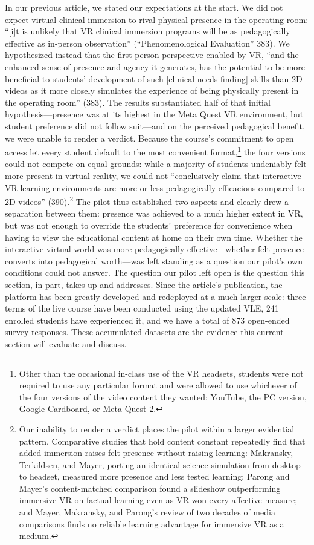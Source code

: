 In our previous article, we stated our expectations at the start. We did not
expect virtual clinical immersion to rival physical presence in the operating
room: ``[i]t is unlikely that VR clinical immersion programs will be as
pedagogically effective as in-person observation'' (``Phenomenological
Evaluation'' 383). We hypothesized instead that the first-person perspective
enabled by VR, ``and the enhanced sense of presence and agency it generates, has
the potential to be more beneficial to students' development of such [clinical
needs-finding] skills than 2D videos as it more closely simulates the experience
of being physically present in the operating room'' (383). The results
substantiated half of that initial hypothesis---presence was at its highest in
the Meta Quest VR environment, but student preference did not follow suit---and
on the perceived pedagogical benefit, we were unable to render a verdict.
Because the course's commitment to open access let every student default to the
most convenient format,\footnote{Other than the occasional in-class use of the
VR headsets, students were not required to use any particular format and were
allowed to use whichever of the four versions of the video content they wanted:
YouTube, the PC version, Google Cardboard, or Meta Quest 2.} the four versions
could not compete on equal grounds: while a majority of students undeniably felt
more present in virtual reality, we could not ``conclusively claim that
interactive VR learning environments are more or less pedagogically efficacious
compared to 2D videos'' (390).\footnote{Our inability to render a verdict places
the pilot within a larger evidential pattern. Comparative studies that hold
content constant repeatedly find that added immersion raises felt presence
without raising learning: Makransky, Terkildsen, and Mayer, porting an identical
science simulation from desktop to headset, measured more presence and less
tested learning; Parong and Mayer's content-matched comparison found a slideshow
outperforming immersive VR on factual learning even as VR won every affective
measure; and Mayer, Makransky, and Parong's review of two decades of media
comparisons finds no reliable learning advantage for immersive VR as a medium.} The pilot thus established two aspects and
clearly drew a separation between them: presence was achieved to a much higher
extent in VR, but was not enough to override the students' preference for
convenience when having to view the educational content at home on their own
time. Whether the interactive virtual world was more pedagogically
effective---whether felt presence converts into pedagogical worth---was left
standing as a question our pilot's own conditions could not answer. The question
our pilot left open is the question this section, in part, takes up and
addresses. Since the article's publication, the platform has been greatly
developed and redeployed at a much larger scale: three terms of the live course
have been conducted using the updated VLE, 241 enrolled students have
experienced it, and we have a total of 873 open-ended survey responses. These
accumulated datasets are the evidence this current section will evaluate and
discuss.

